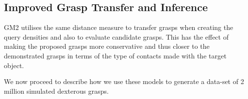\subsection{Improved Grasp Transfer and Inference}
GM2 utilises the same distance measure to transfer grasps when creating the query densities and also to evaluate candidate grasps. This has the effect of making the proposed grasps more conservative and thus closer to the demonstrated grasps in terms of the type of contacts made with the target object.

We now proceed to describe how we use these models to generate a data-set of 2 million simulated dexterous grasps.
